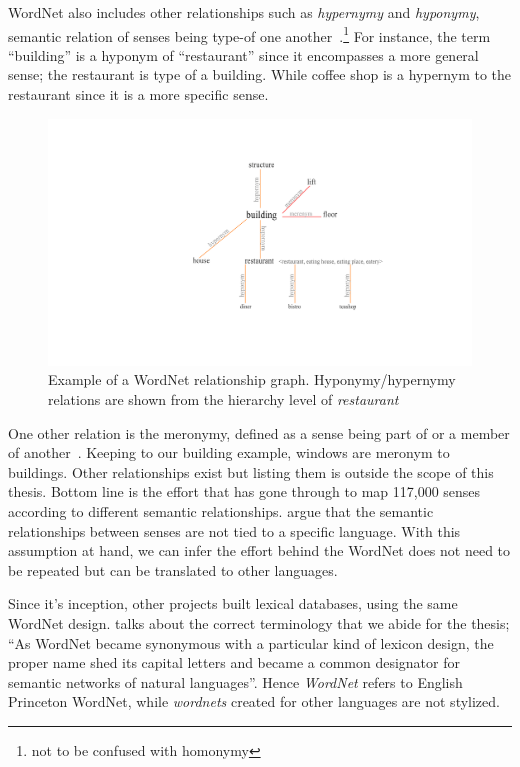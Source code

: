 WordNet also includes other relationships such as \emph{hypernymy} and \emph{hyponymy}, semantic relation of senses being type-of one another~\cite{miller_nouns_1990}.\footnote{not to be confused with homonymy}
For instance, the term \enquote{building} is a hyponym of \enquote{restaurant} since it encompasses a more general sense; the restaurant is type of a building.
While coffee shop is a hypernym to the restaurant since it is a more specific sense.

\begin{figure}[htbp]
    \centering
    \includegraphics[page=1,width=\textwidth]{Figures/hyponym_hypernym.pdf}
    \caption{Example of a WordNet relationship graph. Hyponymy/hypernymy relations are shown from the hierarchy level of \emph{restaurant}}%
    \label{fig:hyponymy}
\end{figure}

One other relation is the meronymy, defined as a sense being part of or a member of another~\cite{winston_taxonomy_1987}.
Keeping to our building example, windows are meronym to buildings.
Other relationships exist but listing them is outside the scope of this thesis.
Bottom line is the effort that has gone through to map 117,000 senses according to different semantic relationships.
\textcite{sagot_building_2008} argue that the semantic relationships between senses are not tied to a specific language.
With this assumption at hand, we can infer the effort behind the WordNet does not need to be repeated but can be translated to other languages.

Since it's inception, other projects built lexical databases, using the same WordNet design.
\textcite{fellbaum_semantic_1998} talks about the correct terminology that we abide for the thesis; \enquote{As WordNet became synonymous with a particular kind of lexicon design, the proper name shed its capital letters and became a common designator for semantic networks of natural languages}.
Hence \emph{WordNet} refers to English Princeton WordNet, while \emph{wordnets} created for other languages are not stylized.

